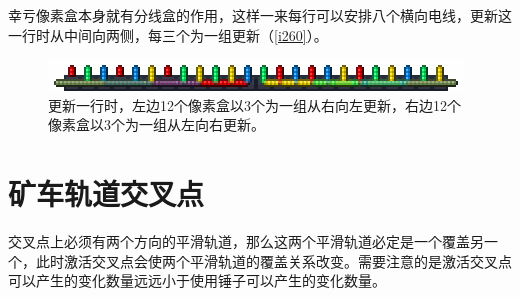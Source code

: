 幸亏像素盒本身就有分线盒的作用，这样一来每行可以安排八个横向电线，更新这一行时从中间向两侧，每三个为一组更新（\autoref{i260}）。

\begin{figure}[!ht]
\centering
\includegraphics{images/260.png}
\caption{更新一行时，左边12个像素盒以3个为一组从右向左更新，右边12个像素盒以3个为一组从左向右更新。}
\label{i260}
\end{figure}

\section{矿车轨道交叉点}
交叉点上必须有两个方向的平滑轨道，那么这两个平滑轨道必定是一个覆盖另一个，此时激活交叉点会使两个平滑轨道的覆盖关系改变。需要注意的是激活交叉点可以产生的变化数量远远小于使用锤子可以产生的变化数量。

